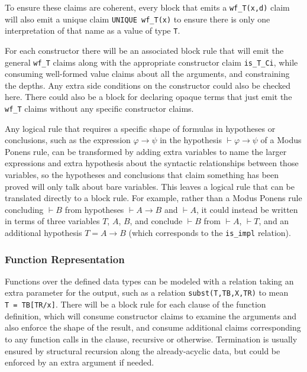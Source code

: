 \documentclass{article}
\theoremstyle{plain}
\theoremstyle{definition}
\begin{document}
To ensure these claims are coherent, every block that emits a
\texttt{wf\_T(x,d)} claim will also emit a unique claim
\texttt{UNIQUE wf\_T(x)} to ensure there is only one interpretation of that
name as a value of type \texttt{T}.

For each constructor there will be an associated block rule that
will emit the general \texttt{wf\_T} claims along with the appropriate
constructor claim \texttt{is\_T\_Ci}, while consuming
well-formed value claims about all the arguments, and constraining the
depths. Any extra side conditions on the constructor could also be
checked here. There could also be a block for declaring opaque terms that
just emit the \texttt{wf\_T} claims without any specific constructor
claims.

Any logical rule that requires a specific shape of formulas in hypotheses
or conclusions, such as the expression $\varphi \rightarrow \psi$ in
the hypothesis $\vdash \varphi \rightarrow \psi$ of a Modus Ponens
rule, can be transformed by adding extra variables to
name the larger expressions and extra hypothesis about the syntactic
relationships between those variables, so the hypotheses and conclusions
that claim something has been proved will only talk about bare variables.
This leaves a logical rule that can be translated directly to a block
rule.
For example, rather than a Modus Ponens rule concluding $\vdash B$
from hypotheses $\vdash A \rightarrow B$ and $\vdash A$, it could
instead be written in terms of three variables $T$, $A$, $B$,
and conclude $\vdash B$ from $\vdash A$, $\vdash T$, and an
additional hypothesis $T = A \rightarrow B$ (which corresponds to the
\texttt{is_impl} relation).

\subsubsection{Function Representation}\label{function-representation}

Functions over the defined data types can be modeled with a relation
taking an extra parameter for the output, such as a relation
\texttt{subst(T,TB,X,TR)} to mean \texttt{T\ =\ TB{[}TR/x{]}}.
There will be a block rule for each clause of the function definition,
which will consume constructor claims to examine the arguments and
also enforce the shape of the result, and consume additional
claims corresponding to any function calls in the clause, recursive or
otherwise. Termination is usually ensured by structural recursion along
the already-acyclic data, but could be enforced by an extra argument if
needed.
\end{document}
